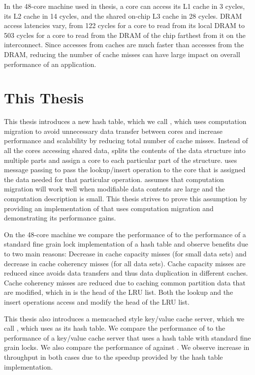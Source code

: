 In the 48-core machine used in thesis, a core can access its L1 cache in 3 cycles, its L2 cache in 14 cycles, and the shared on-chip 
L3 cache in 28 cycles. DRAM access latencies vary, from 122 cycles for a core to read from its local DRAM to 503 cycles for a 
core to read from the DRAM of the chip farthest from it on the interconnect. Since accesses from caches are much faster than 
accesses from the DRAM, reducing the number of cache misses can have large impact on overall performance of an application.


\section{This Thesis}

This thesis introduces a new hash table, which we call \cphash{}, which uses computation migration to avoid unnecessary data transfer between cores 
and increase performance and scalability by reducing total number of cache misses. Instead of all the cores accessing shared data, \cphash{} splits the 
contents of the data structure into multiple parts and assign a core to each particular part of the structure. \cphash{} uses message passing 
to pass the lookup/insert operation to the core that is assigned the data needed for that particular operation. \cphash{} assumes that computation migration will 
work well when modifiable data contents are large and the computation description is small. This thesis strives to prove this 
assumption by providing an implementation of \cphash{} that uses computation migration and demonstrating its performance gains. 

On the 48-core machine we compare the performance of \cphash{} to the performance of a standard fine grain lock implementation of a hash table and 
observe benefits due to two main reasons: Decrease in cache capacity misses (for small data sets) and decrease in cache coherency misses (for all data sets).
Cache capacity misses are reduced since \cphash{} avoids data transfers and thus data duplication in different caches. Cache coherency misses
are reduced due to caching common partition data that are modified, which in \cphash{} is the head of the LRU list. Both the lookup and the insert 
operations access and modify the head of the LRU list.

This thesis also introduces a memcached style key/value cache server, which we call \cpserver{}, which uses \cphash{} as its hash table. We compare the performance of \cpserver{} to the
performance of a key/value cache server that uses a hash table with standard fine grain locks. We also compare the performance of \cpserver{} against \memcached{}.
We observe increase in throughput in both cases due to the speedup provided by the \cphash{} hash table implementation. 

